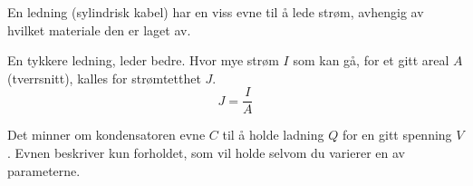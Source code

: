 En ledning (sylindrisk kabel) har en viss evne til å lede strøm,
avhengig av hvilket materiale den er laget av.

En tykkere ledning, leder bedre.
Hvor mye strøm $I$ som kan gå, for et gitt areal $A$ (tverrsnitt),
kalles for strømtetthet $J$.
$$J = \frac{I}{A}$$

Det minner om kondensatoren evne $C$ til å holde ladning $Q$
for en gitt spenning $V$.
Evnen beskriver kun forholdet, som vil holde selvom du varierer en
av parameterne.
